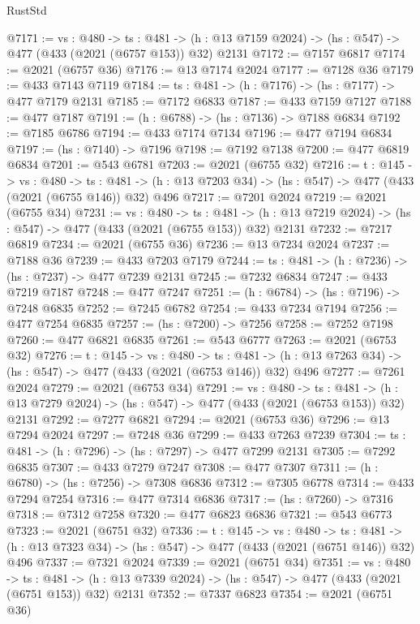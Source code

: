 \begin{lexlean}{RustStd}
\begin{coremodule}
{\begin{coremodule}
{{{{{{{{{{{{{{{{@7171 := {vs : @480} ->
  {ts : @481} -> (h : @13 @7159 @2024) -> (hs : @547) -> @477 (@433 (@2021 (@6757 @153)) @32) @2131
@7172 := @7157 @6817
@7174 := @2021 (@6757 @36)
@7176 := @13 @7174 @2024
@7177 := @7128 @36
@7179 := @433 @7143 @7119
@7184 := {ts : @481} -> (h : @7176) -> (hs : @7177) -> @477 @7179 @2131
@7185 := @7172 @6833
@7187 := @433 @7159 @7127
@7188 := @477 @7187
@7191 := (h : @6788) -> (hs : @7136) -> @7188 @6834
@7192 := @7185 @6786
@7194 := @433 @7174 @7134
@7196 := @477 @7194 @6834
@7197 := (hs : @7140) -> @7196
@7198 := @7192 @7138
@7200 := @477 @6819 @6834
@7201 := @543 @6781
@7203 := @2021 (@6755 @32)
@7216 := {t : @145} ->
  {vs : @480} ->
  {ts : @481} -> (h : @13 @7203 @34) -> (hs : @547) -> @477 (@433 (@2021 (@6755 @146)) @32) @496
@7217 := @7201 @2024
@7219 := @2021 (@6755 @34)
@7231 := {vs : @480} ->
  {ts : @481} -> (h : @13 @7219 @2024) -> (hs : @547) -> @477 (@433 (@2021 (@6755 @153)) @32) @2131
@7232 := @7217 @6819
@7234 := @2021 (@6755 @36)
@7236 := @13 @7234 @2024
@7237 := @7188 @36
@7239 := @433 @7203 @7179
@7244 := {ts : @481} -> (h : @7236) -> (hs : @7237) -> @477 @7239 @2131
@7245 := @7232 @6834
@7247 := @433 @7219 @7187
@7248 := @477 @7247
@7251 := (h : @6784) -> (hs : @7196) -> @7248 @6835
@7252 := @7245 @6782
@7254 := @433 @7234 @7194
@7256 := @477 @7254 @6835
@7257 := (hs : @7200) -> @7256
@7258 := @7252 @7198
@7260 := @477 @6821 @6835
@7261 := @543 @6777
@7263 := @2021 (@6753 @32)
@7276 := {t : @145} ->
  {vs : @480} ->
  {ts : @481} -> (h : @13 @7263 @34) -> (hs : @547) -> @477 (@433 (@2021 (@6753 @146)) @32) @496
@7277 := @7261 @2024
@7279 := @2021 (@6753 @34)
@7291 := {vs : @480} ->
  {ts : @481} -> (h : @13 @7279 @2024) -> (hs : @547) -> @477 (@433 (@2021 (@6753 @153)) @32) @2131
@7292 := @7277 @6821
@7294 := @2021 (@6753 @36)
@7296 := @13 @7294 @2024
@7297 := @7248 @36
@7299 := @433 @7263 @7239
@7304 := {ts : @481} -> (h : @7296) -> (hs : @7297) -> @477 @7299 @2131
@7305 := @7292 @6835
@7307 := @433 @7279 @7247
@7308 := @477 @7307
@7311 := (h : @6780) -> (hs : @7256) -> @7308 @6836
@7312 := @7305 @6778
@7314 := @433 @7294 @7254
@7316 := @477 @7314 @6836
@7317 := (hs : @7260) -> @7316
@7318 := @7312 @7258
@7320 := @477 @6823 @6836
@7321 := @543 @6773
@7323 := @2021 (@6751 @32)
@7336 := {t : @145} ->
  {vs : @480} ->
  {ts : @481} -> (h : @13 @7323 @34) -> (hs : @547) -> @477 (@433 (@2021 (@6751 @146)) @32) @496
@7337 := @7321 @2024
@7339 := @2021 (@6751 @34)
@7351 := {vs : @480} ->
  {ts : @481} -> (h : @13 @7339 @2024) -> (hs : @547) -> @477 (@433 (@2021 (@6751 @153)) @32) @2131
@7352 := @7337 @6823
@7354 := @2021 (@6751 @36)
}}}}}}}}}}}}}}}}
\end{coremodule}}
\end{coremodule}
\end{lexlean}
